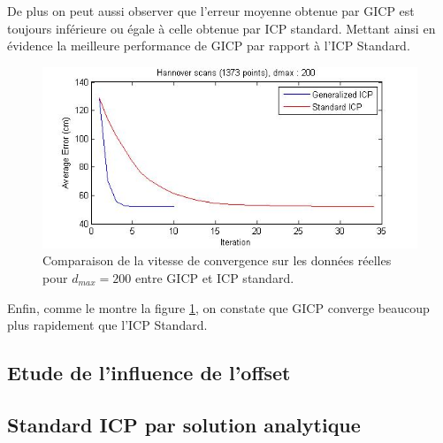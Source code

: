 De plus on peut aussi observer que l'erreur moyenne obtenue par GICP est toujours inférieure ou égale à celle obtenue par ICP standard. Mettant ainsi en évidence la meilleure performance de GICP par rapport à l'ICP Standard.\\

\begin{figure}[!h]
     \centering
     \includegraphics[scale=0.4]{Images/Resultats/hannover_dmax200_diffconvergence.jpg}
     \caption{Comparaison de la vitesse de convergence sur les données réelles pour $d_{max}=200$ entre GICP et ICP standard.}
	\label{fig:GICP_convergence}
\end{figure}

Enfin, comme le montre la figure \ref{fig:GICP_convergence}, on constate que GICP converge beaucoup plus rapidement que l'ICP Standard.
   
\subsection{Etude de l'influence de l'offset}


\subsection{Standard ICP par solution analytique}

